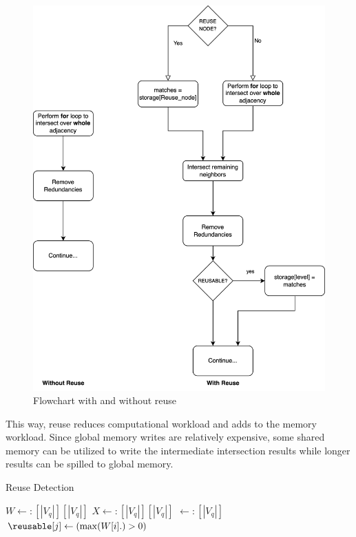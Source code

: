 \begin{figure}
    \centering
    \includegraphics[width=\textwidth]{fig/improvements/reuse-flow1.png}
    \caption{Flowchart with and without reuse}
    \label{fig:reuse-flowchart}
\end{figure}
This way, reuse reduces computational workload and adds to the memory workload.
Since global memory writes are relatively expensive, some shared memory can be utilized to write the intermediate intersection results while longer results can be spilled to global memory.

\begin{algorithm}
    \caption{Reuse Detection}
    \label{algo:reuse}
    $W \leftarrow: [|V_q|][|V_q|]$\;
    $X \leftarrow: [|V_q|][|V_q|]$\;
    \reusable $\leftarrow: [|V_q|]$\;
    $\reusable[j] \leftarrow (\max({W[i].)} > 0)$\;
\end{algorithm}

